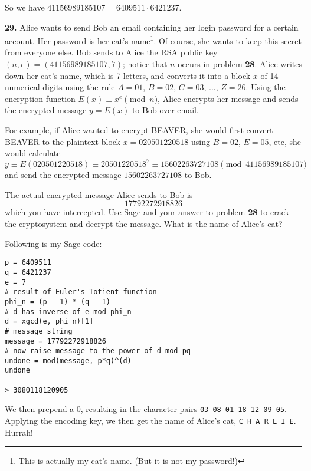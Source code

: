 \documentclass[12pt]{amsart}
\begin{document}
\smallskip

So we have $41156989185107 = 6409511\cdot 6421237$.	

\medskip

\newpage

{\bf 29.}  Alice wants to send Bob an email containing her login password for a certain account.  Her password is her cat's name\footnote{This is actually my cat's name.  (But it is not my password!)}.  Of course, she wants to keep this secret from everyone else.  Bob sends to Alice the RSA public key $(n,e)=(41156989185107,7)$; notice that $n$ occurs in problem {\bf 28}.  Alice writes down her cat's name, which is 7 letters, and converts it into a  block $x$ of 14 numerical digits using the rule $A=01$, $B=02$, $C=03$, ..., $Z=26$.  Using the encryption function $E(x)\equiv x^e\pmod{n}$, Alice encrypts her message and sends the encrypted message $y=E(x)$ to Bob over email.

\medskip

For example, if Alice wanted to encrypt BEAVER, she would first convert BEAVER to the plaintext block $x=020501220518$ using $B=02$, $E=05$, etc, she would calculate 
$$
y\equiv E(020501220518)\equiv 20501220518^7\equiv15602263727108\pmod{41156989185107}
$$
and send the encrypted message $15602263727108$ to Bob.

\medskip 

The actual encrypted message Alice sends to Bob is
$$
17792272918826
$$
which you have intercepted.  Use Sage and your answer to problem {\bf 28} to crack the cryptosystem and decrypt the message.  What is the name of Alice's cat?  

\medskip

Following is my Sage code:

\begin{verbatim}
p = 6409511
q = 6421237
e = 7
# result of Euler's Totient function
phi_n = (p - 1) * (q - 1)
# d has inverse of e mod phi_n
d = xgcd(e, phi_n)[1]
# message string
message = 17792272918826
# now raise message to the power of d mod pq
undone = mod(message, p*q)^(d)
undone

> 3080118120905
\end{verbatim}

We then prepend a 0, resulting in the character pairs \texttt{03 08 01 18 12 09 05}. Applying the encoding key, we then get the name of Alice's cat, \texttt{C H A R L I E}. Hurrah!
\end{document}
